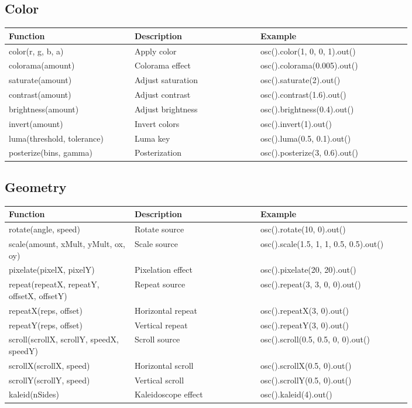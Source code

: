 \documentclass[9pt,oneside]{amsart}
\begin{document}
\subsection*{Color}
\begin{tabular}{L{0.25\linewidth}L{0.25\linewidth}L{0.3\linewidth}}
\toprule
\textbf{Function} & \textbf{Description} & \textbf{Example} \\
\midrule
color(r, g, b, a) & Apply color & osc().color(1, 0, 0, 1).out() \\
colorama(amount) & Colorama effect & osc().colorama(0.005).out() \\
saturate(amount) & Adjust saturation & osc().saturate(2).out() \\
contrast(amount) & Adjust contrast & osc().contrast(1.6).out() \\
brightness(amount) & Adjust brightness & osc().brightness(0.4).out() \\
invert(amount) & Invert colors & osc().invert(1).out() \\
luma(threshold, tolerance) & Luma key & osc().luma(0.5, 0.1).out() \\
posterize(bins, gamma) & Posterization & osc().posterize(3, 0.6).out() \\
\bottomrule
\end{tabular}

\subsection*{Geometry}
\begin{tabular}{L{0.25\linewidth}L{0.25\linewidth}L{0.3\linewidth}}
\toprule
\textbf{Function} & \textbf{Description} & \textbf{Example} \\
\midrule
rotate(angle, speed) & Rotate source & osc().rotate(10, 0).out() \\
scale(amount, xMult, yMult, ox, oy) & Scale source & osc().scale(1.5, 1, 1, 0.5, 0.5).out() \\
pixelate(pixelX, pixelY) & Pixelation effect & osc().pixelate(20, 20).out() \\
repeat(repeatX, repeatY, offsetX, offsetY) & Repeat source & osc().repeat(3, 3, 0, 0).out() \\
repeatX(reps, offset) & Horizontal repeat & osc().repeatX(3, 0).out() \\
repeatY(reps, offset) & Vertical repeat & osc().repeatY(3, 0).out() \\
scroll(scrollX, scrollY, speedX, speedY) & Scroll source & osc().scroll(0.5, 0.5, 0, 0).out() \\
scrollX(scrollX, speed) & Horizontal scroll & osc().scrollX(0.5, 0).out() \\
scrollY(scrollY, speed) & Vertical scroll & osc().scrollY(0.5, 0).out() \\
kaleid(nSides) & Kaleidoscope effect & osc().kaleid(4).out() \\
\bottomrule
\end{tabular}
\end{document}

